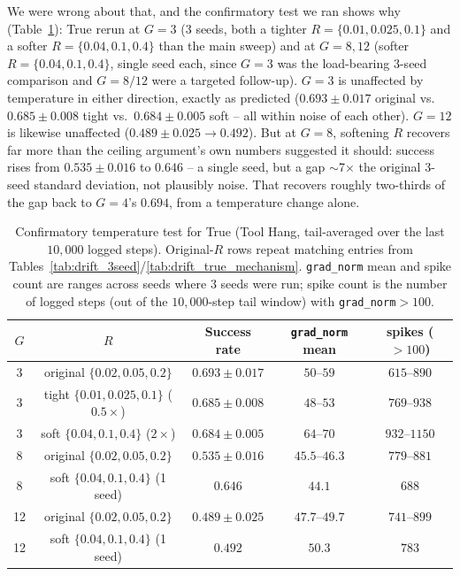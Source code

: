 \documentclass[11pt]{article}
\begin{document}
We were wrong about that, and the confirmatory test we ran shows why
(Table~\ref{tab:drift_temp_confirm}): True rerun at $G=3$ (3 seeds, both
a tighter $R=\{0.01,0.025,0.1\}$ and a softer $R=\{0.04,0.1,0.4\}$ than
the main sweep) and at $G=8,12$ (softer $R=\{0.04,0.1,0.4\}$, single
seed each, since $G=3$ was the load-bearing 3-seed comparison and
$G=8/12$ were a targeted follow-up). $G=3$ is unaffected by temperature
in either direction, exactly as predicted ($0.693\pm0.017$ original vs.\
$0.685\pm0.008$ tight vs.\ $0.684\pm0.005$ soft -- all within noise of
each other). $G=12$ is likewise unaffected ($0.489\pm0.025\to0.492$).
But at $G=8$, softening $R$ recovers far more than the ceiling
argument's own numbers suggested it should: success rises from
$0.535\pm0.016$ to $\mathbf{0.646}$ -- a single seed, but a gap
$\sim$7$\times$ the original 3-seed standard deviation, not plausibly
noise. That recovers roughly two-thirds of the gap back to $G=4$'s
$0.694$, from a temperature change alone.

\begin{table}[H]
\centering
\caption{Confirmatory temperature test for True (Tool Hang, tail-averaged
over the last $10{,}000$ logged steps). Original-$R$ rows repeat
matching entries from Tables~\ref{tab:drift_3seed}/\ref{tab:drift_true_mechanism}.
\texttt{grad\_norm} mean and spike count are ranges across seeds where 3
seeds were run; spike count is the number of logged steps (out of the
$10{,}000$-step tail window) with \texttt{grad\_norm}$>100$.}
\label{tab:drift_temp_confirm}
\begin{tabular}{ccccc}
\toprule
$G$ & $R$ & Success rate & \texttt{grad\_norm} mean & spikes ($>100$) \\
\midrule
3  & original $\{0.02,0.05,0.2\}$             & $0.693 \pm 0.017$ & $50$--$59$     & $615$--$890$  \\
3  & tight $\{0.01,0.025,0.1\}$ ($0.5\times$) & $0.685 \pm 0.008$ & $48$--$53$     & $769$--$938$  \\
3  & soft $\{0.04,0.1,0.4\}$ ($2\times$)      & $0.684 \pm 0.005$ & $64$--$70$     & $932$--$1150$ \\
8  & original $\{0.02,0.05,0.2\}$             & $0.535 \pm 0.016$ & $45.5$--$46.3$ & $779$--$881$  \\
8  & soft $\{0.04,0.1,0.4\}$ (1 seed)          & $\mathbf{0.646}$  & $44.1$         & $688$         \\
12 & original $\{0.02,0.05,0.2\}$             & $0.489 \pm 0.025$ & $47.7$--$49.7$ & $741$--$899$  \\
12 & soft $\{0.04,0.1,0.4\}$ (1 seed)          & $0.492$           & $50.3$         & $783$         \\
\bottomrule
\end{tabular}
\end{table}
\end{document}
